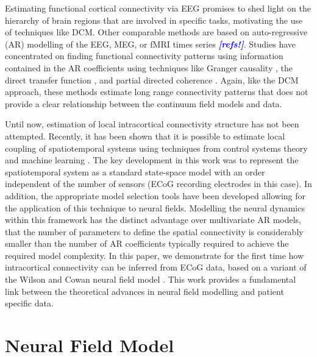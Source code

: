 \documentclass[12pt]{iopart}		%
\newcommand{\todo}[1]{\textsf{\emph{\textbf{\textcolor{blue}{#1}}}}}
\begin{document}
Estimating functional cortical connectivity via EEG promises to shed light on the hierarchy of brain regions that are involved in specific tasks, motivating the use of techniques like DCM. Other comparable methods are based on auto-regressive (AR) modelling of the EEG, MEG, or fMRI times series \todo{[refs!]}. Studies have concentrated on finding functional connectivity patterns using information contained in the AR coefficients using techniques like Granger causality \cite{Hesse2003}, the direct transfer function \cite{Kaminski1991}, and partial directed coherence \cite{Sameshima1999}. Again, like the DCM approach, these methods estimate long range connectivity patterns that does not provide a clear relationship between the continuum field models and data.

Until now, estimation of local intracortical connectivity structure has not been attempted. Recently, it has been shown that it is possible to estimate local coupling of spatiotemporal systems using techniques from control systems theory and machine learning \cite{Dewar2009}. The key development in this work was to represent the spatiotemporal system as a standard state-space model with an order independent of the number of sensors (ECoG recording electrodes in this case). In addition, the appropriate model selection tools have been developed \cite{Scerri2009} allowing for the application of this technique to neural fields. Modelling the neural dynamics within this framework has the distinct advantage over multivariate AR models, that the number of parameters to define the spatial connectivity is considerably smaller than the number of AR coefficients typically required to achieve the required model complexity. In this paper, we demonstrate for the first time how intracortical connectivity can be inferred from ECoG data, based on a variant of the  Wilson and Cowan neural field model \cite{Wilson1973}. This work provides a fundamental link between the theoretical advances in neural field modelling and patient specific data.

\section{Neural Field Model}\label{NeuralModelSection}
\end{document}
